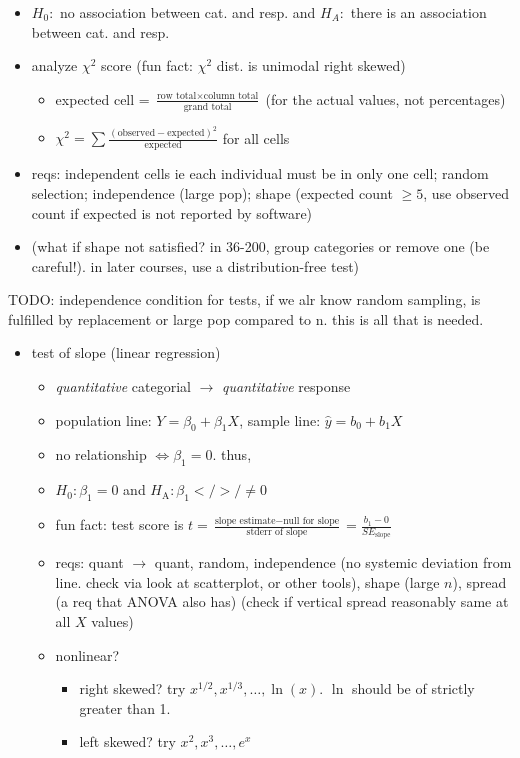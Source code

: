 \documentclass[11pt]{article}
\begin{document}
\begin{itemize}
\begin{itemize}
    \item $H_0:$ no association between cat. and resp. and $H_A:$ there is an association between cat. and resp.
    \item analyze $\chi^2$ score (fun fact: $\chi^2$ dist. is unimodal right skewed)
    \begin{itemize}
      \item expected cell = $\frac{\text{row total} \times \text{column total}}{\text{grand total}}$ (for the actual values, not percentages)
      \item $\chi^2 = \sum \frac{(\text{observed} - \text{expected})^2}{\text{expected}}$ for all cells
    \end{itemize}
    \item reqs: independent cells ie each individual must be in only one cell; random selection; independence (large pop); shape (expected count $\ge 5$, use observed count if expected is not reported by software)
    \item (what if shape not satisfied? in 36-200, group categories or remove one (be careful!). in later courses, use a distribution-free test)
  \end{itemize}
\end{itemize}
TODO: independence condition for tests, if we alr know random sampling, is fulfilled by replacement or large pop compared to n. this is all that is needed.
\begin{itemize}
  \item test of slope (linear regression)
  \begin{itemize}
    \item \emph{quantitative} categorial $\rightarrow$ \emph{quantitative} response
    \item population line: $Y=\beta_0+\beta_1 X$, sample line: $\hat{y}=b_0+b_1X$
    \item no relationship $\iff \beta_1 = 0.$ thus,
    \item $H_0: \beta_1=0$ and $H_\text{A}: \beta_1 < / > / \ne 0$
    \item fun fact: test score is $t=\frac{\text{slope estimate}-\text{null for slope}}{\text{stderr of slope}} = \frac{b_1-0}{SE_\text{slope}}$
    \item reqs: quant $\rightarrow$ quant, random, independence (no systemic deviation from line. check via look at scatterplot, or other tools), shape (large $n$), spread (a req that ANOVA also has) (check if vertical spread reasonably same at all $X$ values)
    \item nonlinear?
    \begin{itemize}
      \item right skewed? try $x^{1/2}, x^{1/3}, \dots, \ln(x)$. $\ln$ should be of strictly greater than 1.
      \item left skewed? try $x^2, x^3, \dots, e^x$
    \end{itemize}
  \end{itemize}
\end{itemize}

\end{document}
